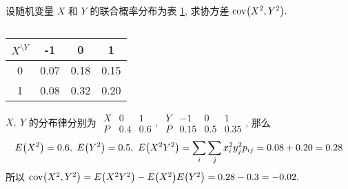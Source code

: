 \begin{example}[2002 数三]
    设随机变量 $X$ 和 $Y$ 的联合概率分布为表 \ref{-101007018015}, 求协方差 $\mathrm{cov}\qty(X^2,Y^2).$
\end{example}
\begin{solution}
    \begin{minipage}{0.3\linewidth}
        \begin{table}[H]
            \centering
            \caption{}
            \label{-101007018015}
            \begin{tabular}{c | c c c}
                $X^{\displaystyle\setminus Y}$ & -1   & 0    & 1    \\
                \midrule
                0                              & 0.07 & 0.18 & 0.15 \\
                1                              & 0.08 & 0.32 & 0.20
            \end{tabular}
        \end{table}
    \end{minipage}\hfill
    \begin{minipage}{0.66\linewidth}
        $X,~Y$ 的分布律分别为 $\begin{array}{c|cc}
                X & 0   & 1   \\\hline
                P & 0.4 & 0.6
            \end{array},~\begin{array}{c|ccc}
                Y & -1   & 0   & 1    \\\hline
                P & 0.15 & 0.5 & 0.35
            \end{array}$, 那么
        $$E\qty(X^2)=0.6,~E\qty(Y^2)=0.5,~E\qty(X^2Y^2)=\sum_i\sum_j x_i^2y_j^2 p_{ij}=0.08+0.20=0.28$$
        所以 $\mathrm{cov}\qty(X^2,Y^2)=E\qty(X^2Y^2)-E\qty(X^2)E\qty(Y^2)=0.28-0.3=-0.02.$
    \end{minipage}
\end{solution}

